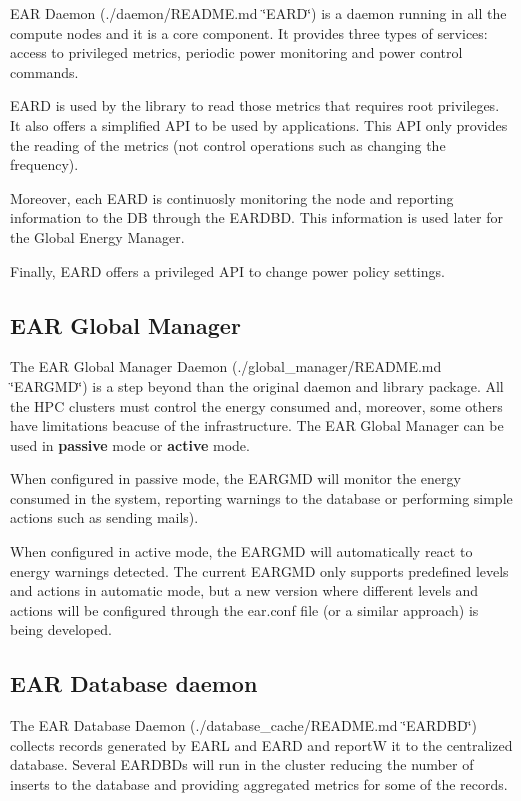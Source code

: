 E\+AR Daemon (./daemon/\+R\+E\+A\+D\+ME.md \char`\"{}\+E\+A\+R\+D\char`\"{}) is a daemon running in all the compute nodes and it is a core component. It provides three types of services\+: access to privileged metrics, periodic power monitoring and power control commands.

E\+A\+RD is used by the library to read those metrics that requires root privileges. It also offers a simplified A\+PI to be used by applications. This A\+PI only provides the reading of the metrics (not control operations such as changing the frequency).

Moreover, each E\+A\+RD is continuosly monitoring the node and reporting information to the DB through the E\+A\+R\+D\+BD. This information is used later for the Global Energy Manager.

Finally, E\+A\+RD offers a privileged A\+PI to change power policy settings.

\subsection*{E\+AR Global Manager}

The E\+AR Global Manager Daemon (./global\+\_\+manager/\+R\+E\+A\+D\+ME.md \char`\"{}\+E\+A\+R\+G\+M\+D\char`\"{}) is a step beyond than the original daemon and library package. All the H\+PC clusters must control the energy consumed and, moreover, some others have limitations beacuse of the infrastructure. The E\+AR Global Manager can be used in {\bfseries passive} mode or {\bfseries active} mode.

When configured in passive mode, the E\+A\+R\+G\+MD will monitor the energy consumed in the system, reporting warnings to the database or performing simple actions such as sending mails).

When configured in active mode, the E\+A\+R\+G\+MD will automatically react to energy warnings detected. The current E\+A\+R\+G\+MD only supports predefined levels and actions in automatic mode, but a new version where different levels and actions will be configured through the {\ttfamily ear.\+conf} file (or a similar approach) is being developed.

\subsection*{E\+AR Database daemon}

The E\+AR Database Daemon (./database\+\_\+cache/\+R\+E\+A\+D\+ME.md \char`\"{}\+E\+A\+R\+D\+B\+D\char`\"{}) collects records generated by E\+A\+RL and E\+A\+RD and reportW it to the centralized database. Several E\+A\+R\+D\+BD\textquotesingle{}s will run in the cluster reducing the number of inserts to the database and providing aggregated metrics for some of the records.

